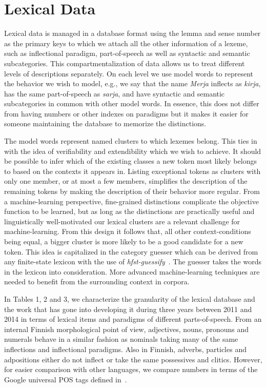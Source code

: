 \documentclass[11pt]{article}
\begin{document}
\section{Lexical Data}

Lexical data is managed in a database format using the lemma and sense number
as the primary keys to which we attach all the other information of a lexeme,
such as inflectional paradigm,  part-of-speech as well as syntactic and
semantic subcategories.  This compartmentalization of data allows us to treat
different levels of descriptions separately.  On each level we use model words
to represent the behavior we wish to model, e.g., we say that the name
\emph{Merja} inflects as \emph{kirja}, has the same part-of-speech as
\emph{sarja}, and have syntactic and semantic subcategories in common with
other model words.  In essence, this does not differ from having numbers or
other indexes on paradigms but it makes it easier for someone maintaining the
database to memorize the distinctions. 

The model words represent named clusters to which lexemes belong.  This ties in
with the idea of verifiability and extendibility which we wish to achieve. It
should be possible to infer which of the existing classes a new token most
likely belongs to based on the contexts it appears in.  Listing exceptional
tokens as clusters with only one member, or at most a few members, simplifies
the description of the remaining tokens by making the description of their
behavior more regular.  From a machine-learning perspective, fine-grained
distinctions complicate the  objective function to be learned, but as long as
the distinctions are practically useful and linguistically well-motivated our
lexical clusters are a relevant challenge for machine-learning.  From this
design it follows that, all other context-conditions being equal, a bigger
cluster is more likely to be a good candidate for a new token.  This idea is
capitalized in the category guesser which can be derived from any finite-state
lexicon with the use of \emph{hfst-guessify}~\cite{linden2008assigning}. The
guesser takes the words in the lexicon into consideration.  More advanced
machine-learning techniques are needed to benefit from the surrounding context
in corpora.

In Tables 1, 2 and 3, we characterize the granularity of the lexical database
and the work that has gone into developing it during three years between 2011
and 2014 in terms of lexical items and paradigms of different parts-of-speech.
From an internal Finnish morphological point of view, adjectives, nouns,
pronouns and numerals behave in a similar fashion as nominals taking many of
the same inflections and inflectional paradigms.  Also in Finnish, adverbs,
particles and adpositions either do not inflect or take the same possessives
and clitics.  However, for easier comparison with other languages, we compare
numbers in terms of the Google universal POS tags defined
in~\cite{petrov2011universal}. 
\end{document}
